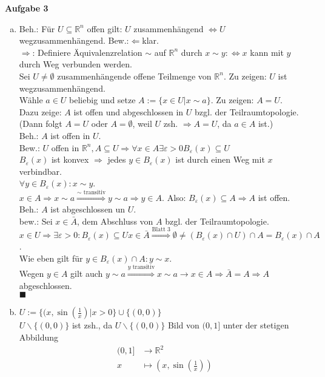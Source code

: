 \documentclass{article}
\begin{document}
\textbf{Aufgabe 3}\\
\begin{enumerate}[(a)]
\item Beh.: Für $U\subseteq\mathbb{R}^n$ offen gilt: $U$ zusammenhängend $\Leftrightarrow U$ wegzusammenhängend.
Bew.:\glqq$\Leftarrow$\grqq klar.\\
\glqq$\Rightarrow$\grqq: Definiere Äquivalenzrelation $\sim$ auf $\mathbb{R}^n$ durch $x\sim y:\Leftrightarrow x$ kann mit $y$ durch Weg verbunden werden.\\
Sei $U\neq\emptyset$ zusammenhängende offene Teilmenge von $\mathbb{R}^n$. Zu zeigen: $U$ ist wegzusammenhängend.\\
Wähle $a\in U$ beliebig und setze $A:=\{x\in U|x\sim a\}$. Zu zeigen: $A=U$.\\
Dazu zeige: $A$ ist offen und abgeschlossen in $U$ bzgl. der Teilraumtopologie. (Dann folgt $A=U$ oder $A=\emptyset$, weil $U$ zsh. $\Rightarrow A=U$, da $a\in A$ ist.)\\
Beh.: $A$ ist offen in $U$.\\
Bew.: $U$ offen in $\mathbb{R}^n, A\subseteq U\Rightarrow\forall x\in A\exists\varepsilon>0 B_\varepsilon(x)\subseteq U$\\
$B_\varepsilon(x)$ ist konvex $\Rightarrow$ jedes $y\in B_\varepsilon(x)$ ist durch einen Weg mit $x$ verbindbar.\\
$\forall y\in B_\varepsilon(x):x\sim y$.\\
$x\in A\Rightarrow x\sim a\stackrel{\sim\text{ transitiv}}{\Rightarrow}y\sim a\Rightarrow y\in A$. Also: $B_\varepsilon(x)\subseteq A\Rightarrow A$ ist offen.\\
Beh.: $A$ ist abgeschlossen un $U$.\\
bew.: Sei $x\in\bar A$, dem Abschluss von $A$ bzgl. der Teilraumtopologie.\\
$x\in U\Rightarrow\exists\varepsilon>0:B_\varepsilon(x)\subseteq U x\in\bar A\stackrel{\text{Blatt 3}}{\Rightarrow}\emptyset\neq(B_\varepsilon(x)\cap U)\cap A = B_\varepsilon(x)\cap A$.\\
Wie eben gilt für $y\in B_\varepsilon(x)\cap A:y\sim x$.\\
Wegen $y\in A$ gilt auch $y\sim a\stackrel{y\text{ transitiv}}{\Rightarrow}x\sim a\rightarrow x\in A\Rightarrow\bar A=A\Rightarrow A$ abgeschlossen.\\
$\blacksquare$
\item $U:=\{(x,\sin\left(\frac{1}{x}\right)|x>0\}\cup\{(0,0)\}$\\
$U\backslash\{(0,0)\}$ ist zsh., da $U\backslash\{(0,0)\}$ Bild von $(0,1]$ unter der stetigen Abbildung
\begin{align*}
(0,1]&\rightarrow\mathbb{R}^2\\
x&\mapsto(x,\sin\left(\frac1x\right))
\end{align*}


\end{enumerate}
\end{document}
